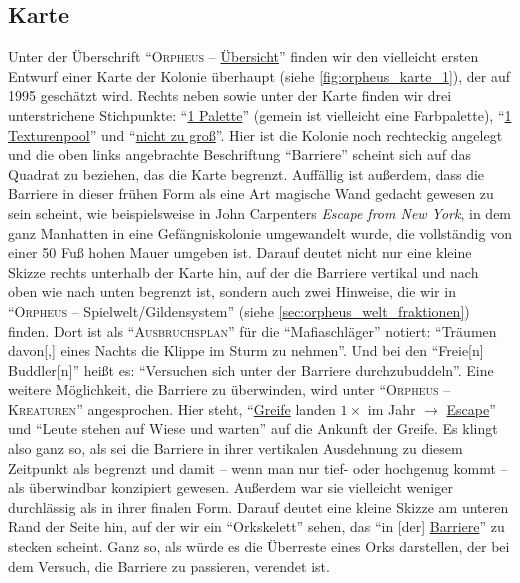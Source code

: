 \documentclass[a5paper,pagesize,numbers=noenddot]{scrbook}
\begin{document}
\subsection{Karte}\label{sec:orpheus_welt_karte}
Unter der Überschrift \enquote{\textsc{Orpheus} -- \uline{Übersicht}} finden wir den vielleicht ersten Entwurf einer Karte der Kolonie überhaupt (siehe \autoref{fig:orpheus_karte_1}), der auf 1995 geschätzt wird.\autocite[Vgl.][]{flosha_evolution_2024} %
Rechts neben sowie unter der Karte finden wir drei unterstrichene Stichpunkte: \enquote{\uline{1 Palette}} (gemein ist vielleicht eine Farbpalette), \enquote{\uline{1 Texturenpool}} und \enquote{\uline{nicht zu groß}}.
Hier ist die Kolonie noch rechteckig angelegt und die oben links angebrachte Beschriftung \enquote{Barriere} scheint sich auf das Quadrat zu beziehen, das die Karte begrenzt.
Auffällig ist außerdem, dass die Barriere in dieser frühen Form als eine Art magische Wand gedacht gewesen zu sein scheint, wie beispielsweise in John Carpenters \textit{Escape from New York}, in dem ganz Manhatten in eine Gefängniskolonie umgewandelt wurde, die vollständig von einer 50 Fuß hohen Mauer umgeben ist.
Darauf deutet nicht nur eine kleine Skizze rechts unterhalb der Karte hin, auf der die Barriere vertikal und nach oben wie nach unten begrenzt ist, sondern auch zwei Hinweise, die wir in \enquote{\textsc{Orpheus} -- Spielwelt/Gildensystem} (siehe \autoref{sec:orpheus_welt_fraktionen}) finden.
Dort ist als \enquote{\textsc{Ausbruchsplan}} für die \enquote{Mafiaschläger} notiert:
\enquote{Träumen davon[,] eines Nachts die Klippe im Sturm zu nehmen}.
Und bei den \enquote{Freie[n] Buddler[n]} heißt es:
\enquote{Versuchen sich unter der Barriere durchzubuddeln}.
Eine weitere Möglichkeit, die Barriere zu überwinden, wird unter \enquote{\textsc{Orpheus -- Kreaturen}} angesprochen.
Hier steht, \enquote{\uline{Greife} landen $1\times$ im Jahr $\rightarrow$ \uline{Escape}} und \enquote{Leute stehen auf Wiese und warten} auf die Ankunft der Greife.
Es klingt also ganz so, als sei die Barriere in ihrer vertikalen Ausdehnung zu diesem Zeitpunkt als begrenzt und damit -- wenn man nur tief- oder hochgenug kommt -- als überwindbar konzipiert gewesen.
Außerdem war sie vielleicht weniger durchlässig als in ihrer finalen Form.
Darauf deutet eine kleine Skizze am unteren Rand der Seite hin, auf der wir ein \enquote{Orkskelett} sehen, das \enquote{in [der] \uline{Barriere}} zu stecken scheint.
Ganz so, als würde es die Überreste eines Orks darstellen, der bei dem Versuch, die Barriere zu passieren, verendet ist.
\end{document}
